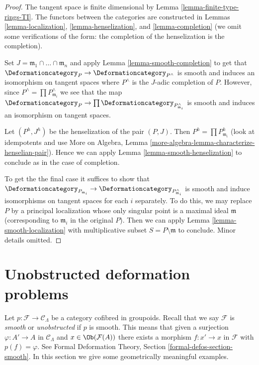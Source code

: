 \begin{proof}
The tangent space is finite dimensional by
Lemma \ref{lemma-finite-type-rings-TI}.
The functors between the categories are constructed
in Lemmas \ref{lemma-localization}, \ref{lemma-henselization}, and
\ref{lemma-completion} (we omit some verifications of the form:
the completion of the henselization is the completion).

\medskip\noindent
Set $J = \mathfrak m_1 \cap \ldots \cap \mathfrak m_n$ and apply
Lemma \ref{lemma-smooth-completion} to get that
$\Deformationcategory_P \to \Deformationcategory_{P^\wedge}$
is smooth and induces an isomorphism on tangent spaces
where $P^\wedge$ is the $J$-adic completion of $P$.
However, since $P^\wedge = \prod P_{\mathfrak m_i}^\wedge$
we see that the map $\Deformationcategory_P \to
\prod \Deformationcategory_{P_{\mathfrak m_i}^\wedge}$
is smooth and induces an isomorphism on tangent spaces.

\medskip\noindent
Let $(P^h, J^h)$ be the henselization of the pair $(P, J)$.
Then $P^h = \prod P_{\mathfrak m_i}^h$ (look at idempotents
and use More on Algebra, Lemma
\ref{more-algebra-lemma-characterize-henselian-pair}).
Hence we can apply Lemma \ref{lemma-smooth-henselization}
to conclude as in the case of completion.

\medskip\noindent
To get the the final case it suffices to show that
$\Deformationcategory_{P_{\mathfrak m_i}} \to
\Deformationcategory_{P_{\mathfrak m_i}^\wedge}$
is smooth and induce isomorphisms on tangent spaces for each $i$ separately.
To do this, we may replace $P$ by a principal localization
whose only singular point is a maximal ideal $\mathfrak m$
(corresponding to $\mathfrak m_i$ in the original $P$).
Then we can apply
Lemma \ref{lemma-smooth-localization}
with multiplicative subset $S = P \setminus \mathfrak m$ to conclude.
Minor details omitted.
\end{proof}






\section{Unobstructed deformation problems}
\label{section-unobstructed}

\noindent
Let $p : \mathcal{F} \to \mathcal{C}_\Lambda$ be a
category cofibred in groupoids. Recall that we say $\mathcal{F}$
is {\it smooth} or {\it unobstructed} if $p$ is smooth.
This means that given a surjection $\varphi : A' \to A$ in
$\mathcal{C}_\Lambda$ and $x \in \Ob(\mathcal{F}(A))$
there exists a morphism $f : x' \to x$ in $\mathcal{F}$
with $p(f) = \varphi$.
See Formal Deformation Theory, Section \ref{formal-defos-section-smooth}.
In this section we give some geometrically meaningful examples.

